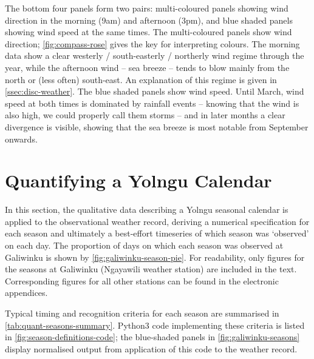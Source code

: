 \begin{framedbox}
    The bottom four panels form two pairs: multi-coloured panels showing wind
    direction in the morning (9am) and afternoon (3pm), and blue shaded
    panels showing wind speed at the same times.
    The multi-coloured panels show wind direction; \cref{fig:compass-rose} gives
    the key for interpreting colours.  The morning data show a clear westerly /
    south-easterly / northerly wind regime through the year, while the afternoon
    wind -- sea breeze -- tends to blow mainly from the north or (less often)
    south-east.  An explanation of this regime is given in \cref{ssec:disc-weather}.
    The blue shaded panels show wind speed.  Until March, wind speed at
    both times is dominated by rainfall events -- knowing that the wind is also
    high, we could properly call them storms -- and in later months a clear
    divergence is visible, showing that the sea breeze is most notable from
    September onwards.
\end{framedbox}

\checkoddpage\ifoddpage\else\ObservationMultipanels\fi


\section{Quantifying a Yolngu Calendar}
\label{sec:applying-seasons-method}

In this section, the qualitative data describing a Yolngu seasonal
calendar is applied to the observational weather record, deriving
a numerical specification for each season and ultimately a best-effort
timeseries of which season was `observed' on each day.  The proportion
of days on which each season was observed at Galiwinku is shown by
\cref{fig:galiwinku-season-pie}.
%
For readability, only figures for the seasons at Galiwinku
(Ngayawili weather station) are included in the text.  Corresponding
figures for all other stations can be found in the electronic appendices.

Typical timing and recognition criteria for each season are summarised in
\cref{tab:quant-seasons-summary}.  Python3 code implementing these criteria
is listed in \cref{fig:season-definitions-code}; the blue-shaded panels in
\cref{fig:galiwinku-seasons} display normalised output from application of
this code to the weather record.

